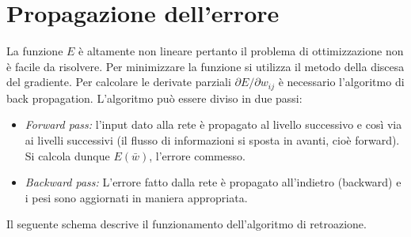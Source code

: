 \newpage

\section{Propagazione dell'errore} %
\label{sec:back_propagation}
La funzione $E$ è altamente non lineare pertanto il problema di ottimizzazione non è facile da risolvere. Per minimizzare la funzione si utilizza il metodo della discesa del gradiente. Per calcolare le derivate parziali $\partial E / \partial w_{ij}$ è necessario l'algoritmo di back propagation. L'algoritmo può essere diviso in due passi:
\begin{itemize}
	\item \emph{Forward pass:} l'input dato alla rete è propagato al livello successivo e così via ai livelli successivi (il flusso di informazioni si sposta in avanti, cioè forward). Si calcola dunque $E(\bar{w})$, l'errore commesso.
	\item \emph{Backward pass:} L'errore fatto dalla rete è propagato all'indietro (backward) e i pesi sono aggiornati in maniera appropriata.
\end{itemize}
Il seguente schema descrive il funzionamento dell'algoritmo di retroazione.
